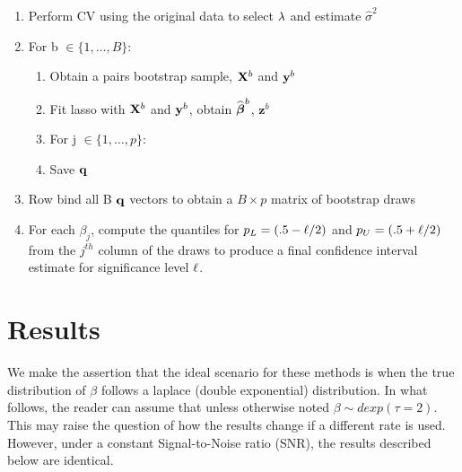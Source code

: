 \begin{enumerate}
\item Perform CV using the original data to select $\lambda$ and estimate $\hat{\sigma}^2$
\item For b $\in \lbrace 1, \ldots, B \rbrace$:
\begin{enumerate}
\item Obtain a pairs bootstrap sample, $\mathbf{X}^b$ and $\mathbf{y}^b$
\item Fit lasso with $\mathbf{X}^b$ and $\mathbf{y}^b$, obtain $\widehat{\boldsymbol{\beta}}^b$, $\boldsymbol{z}^b$
\item For j $\in \lbrace 1, \ldots, p \rbrace$:
	\begin{algorithmic}
    \EndCase
    \EndCase
    \EndCase
    \EndCase
	\EndSwitch 
	\end{algorithmic}
\item Save $\mathbf{q}$
\end{enumerate}
\item Row bind all B $\mathbf{q}$ vectors to obtain a $B \times p$ matrix of bootstrap draws
\item For each $\beta_j$, compute the quantiles for $p_L = (.5 - \ell/2)$ and $p_U = (.5 + \ell/2)$ from the $j^{th}$ column of the draws to produce a final confidence interval estimate for significance level $\ell$.
\end{enumerate}

\section{Results}

We make the assertion that the ideal scenario for these methods is when the true distribution of $\beta$ follows a laplace (double exponential) distribution. In what follows, the reader can assume that unless otherwise noted $\beta \sim dexp(\tau = 2)$. This may raise the question of how the results change if a different rate is used. However, under a constant Signal-to-Noise ratio (SNR), the results described below are identical.

